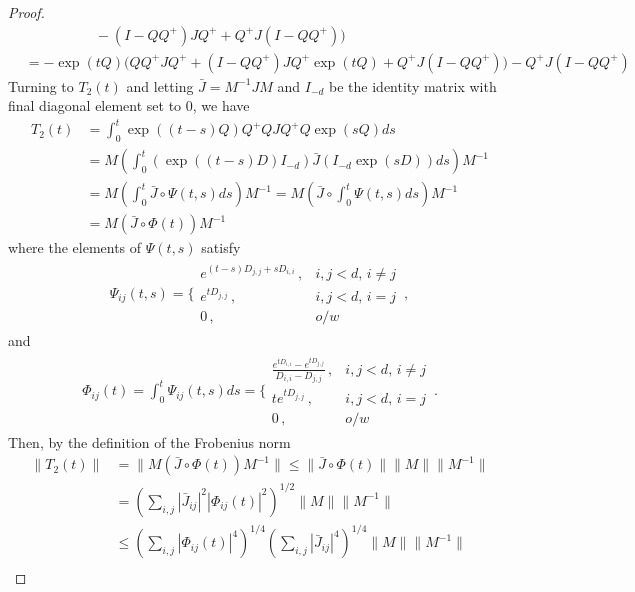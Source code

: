 \documentclass[twoside]{article}
\numberwithin{equation}{section}
\begin{document}
\begin{proof}
\begin{align*}
      &\qquad \qquad  \quad - (I - Q Q^+ )J Q^+
     +  Q^+ J (I- Q Q^+) \biggr)\\
&= -\exp(tQ)\biggl(Q Q^+J Q^+ + (I - Q Q^+ )J Q^+\exp(tQ)  +Q^+ J (I- Q Q^+)  \biggr)
     - Q^+ J (I- Q Q^+)
\end{align*}
Turning to $T_2(t)$ and letting $\bar{J}=M^{-1} J M$ and $I_{-d}$ be the identity matrix with final diagonal element set to 0, we have
\begin{align*}
	 T_2(t)  &=  \int_0^t \exp((t-s)Q)  Q^+ Q J Q^+ Q\exp(s Q)ds  \\
	&= M  \left(\int_0^t (\exp((t-s)D) I_{-d} )  \bar{J} (I_{-d} \exp(s D))ds \right) M^{-1} \\
	&= M  \left(\int_0^t   \bar{J} \circ \Psi(t,s)  ds \right) M^{-1}  = M  \left(\bar{J} \circ \int_0^t    \Psi(t,s)  ds \right) M^{-1} \\
	&= M  \left(\bar{J} \circ    \Phi(t)   \right) M^{-1} \, 
\end{align*}
where the elements of $\Psi(t,s)$ satisfy
\begin{align*}
	\Psi_{ij}(t,s) = \Bigg \{ \begin{array}{cc}
		e^{(t-s) D_{j,j} + sD_{i,i}}  \, , & i,j < d ,\, i\neq j \\
		e^{tD_{j,j}} \, , &  i,j < d ,\, i= j  \\
		0          \, , & o/w  
	\end{array} \, ,
\end{align*}
and
\begin{align*}
 	\Phi_{ij}(t) = \int^t_0 \Psi_{ij}(t,s) ds = \Bigg\{ \begin{array}{cc}
 		\frac{e^{tD_{i,i}}-e^{tD_{j,j}}}{D_{i,i}-D_{j,j}}  \, , & i,j < d ,\, i\neq j \\
 		te^{tD_{j,j}} \, , &  i,j < d ,\, i= j  \\
 		0          \, , & o/w  
 	\end{array}   \, .
\end{align*}
Then, by the definition of the Frobenius norm
\begin{align*}
	\lVert T_2(t)  \rVert &= \lVert M  \left(\bar{J} \circ    \Phi(t)   \right) M^{-1}  \rVert  \leq  \lVert \bar{J} \circ    \Phi(t) \rVert    \lVert M \rVert \lVert M^{-1}  \rVert  \\
	&=  \left(\sum_{i,j} |\bar{J}_{ij}|^{2} |\Phi_{ij}(t) |^2 \right)^{1/2}  \lVert M \rVert \lVert M^{-1}  \rVert\\
	&\leq \left(\sum_{i,j} |\Phi_{ij}(t)|^4 \right)^{1/4} \left( \sum_{i,j} |\bar{J}_{ij}|^{4} \right)^{1/4}   \lVert M \rVert \lVert M^{-1}  \rVert \\

\end{align*}
\end{proof}
\end{document}
